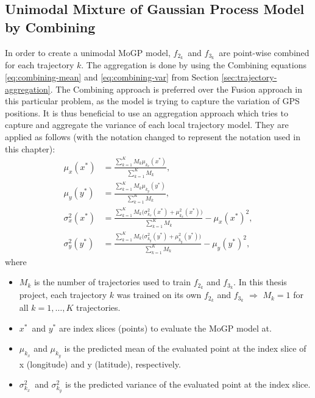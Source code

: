 \subsection{Unimodal Mixture of Gaussian Process Model by Combining}
In order to create a unimodal MoGP model, $f_{2_k}$ and $f_{3_k}$ are point-wise combined for each trajectory $k$.
The aggregation is done by using the Combining equations \ref{eq:combining-mean} and \ref{eq:combining-var} from Section \ref{sec:trajectory-aggregation}.
The Combining approach is preferred over the Fusion approach in this particular problem, as the model is trying to capture the variation of GPS positions.
It is thus beneficial to use an aggregation approach which tries to capture and aggregate the variance of each local trajectory model.
They are applied as follows (with the notation changed to represent the notation used in this chapter):
\begin{align}
    \mu_x(x^*) &= \frac{\sum_{k=1}^{K} M_k\mu_{k_x}(x^*)}{\sum_{k=1}^{K} M_k}, \label{eq:combined-mu-x} \\
    \mu_y(y^*) &= \frac{\sum_{k=1}^{K} M_k\mu_{k_y}(y^*)}{\sum_{k=1}^{K} M_k}, \label{eq:combined-mu-y} \\
    \sigma_x^2(x^*) &= \frac{\sum_{k=1}^{K} M_k\Big(\sigma_{k_x}^2(x^*) + \mu_{k_x}^2(x^*)\Big)}{\sum_{k=1}^{K} M_k} - \mu_x(x^*)^2, \label{eq:combined-var-x} \\
    \sigma_y^2(y^*) &= \frac{\sum_{k=1}^{K} M_k\Big(\sigma_{k_y}^2(y^*) + \mu_{k_y}^2(y^*)\Big)}{\sum_{k=1}^{K} M_k} - \mu_y(y^*)^2, \label{eq:combined-var-y}
\end{align}
where
\begin{itemize}
    \item $M_k$ is the number of trajectories used to train $f_{2_k}$ and $f_{3_k}$.
    In this thesis project, each trajectory $k$ was trained on its own $f_{2_k}$ and $f_{3_k}$ $\Rightarrow$ $M_k = 1$ for all $k = 1,\dotso,K$ trajectories.
    \item $x^*$ and $y^*$ are index slices (points) to evaluate the MoGP model at.
    \item $\mu_{k_x}$ and $\mu_{k_y}$ is the predicted mean of the evaluated point at the index slice of x (longitude) and y (latitude), respectively. 
    \item $\sigma_{k_x}^2$ and $\sigma_{k_y}^2$ is the predicted variance of the evaluated point at the index slice. 
\end{itemize}

